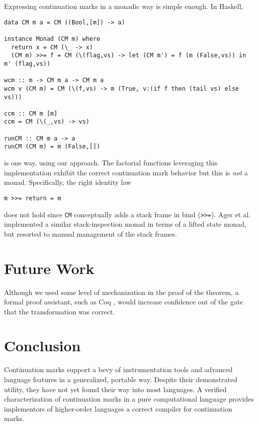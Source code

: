 \documentclass{llncs}
\begin{document}
Expressing continuation marks in a monadic way is simple enough. In Haskell,
\begin{verbatim}
data CM m a = CM ((Bool,[m]) -> a)

instance Monad (CM m) where
  return x = CM (\_ -> x)
  (CM m) >>= f = CM (\(flag,vs) -> let (CM m') = f (m (False,vs)) in m' (flag,vs))

wcm :: m -> CM m a -> CM m a
wcm v (CM m) = CM (\(f,vs) -> m (True, v:(if f then (tail vs) else vs)))

ccm :: CM m [m]
ccm = CM (\(_,vs) -> vs)

runCM :: CM m a -> a
runCM (CM m) = m (False,[])
\end{verbatim}
is one way, using our approach. The factorial functions leveraging this implementation exhibit the correct continuation mark behavior but this is \emph{not} a monad. Specifically, the right identity law
\begin{verbatim}
m >>= return = m
\end{verbatim}
does not hold since \texttt{CM} conceptually adds a stack frame in bind (\texttt{>>=}). Ager et al. \cite{ager2003functional} implemented a similar stack-inspection monad in terms of a lifted state monad, but resorted to manual management of the stack frames.

\section{Future Work}

Although we used some level of mechanization in the proof of the theorem, a formal proof assistant, such as Coq \cite{barras1997coq}, would increase confidence out of the gate that the transformation was correct.

\section{Conclusion}

Continuation marks support a bevy of instrumentation tools and advanced language features in a generalized, portable way. Despite their demonstrated utility, they have not yet found their way into most languages. A verified characterization of continuation marks in a pure computational language provides implementors of higher-order languages a correct compiler for continuation marks.



\end{document}
